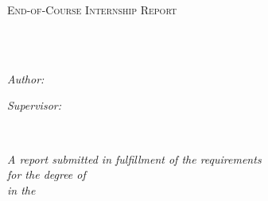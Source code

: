 \documentclass[
11pt, %
oneside, %
english, %
singlespacing, %
headsepline, %
]{MastersDoctoralThesis} %
\author{Simon \textsc{Bataille}} %
\begin{document}
\frontmatter %

\pagestyle{plain} %


\begin{titlepage}
\begin{center}

\vspace*{.06\textheight}
{\scshape\LARGE \univname\par}\vspace{1.5cm} %
\textsc{\Large End-of-Course Internship Report}\\[0.5cm] %

\HRule \\[0.4cm] %
{\huge \bfseries \ttitle\par}\vspace{0.4cm} %
\HRule \\[1.5cm] %

\begin{minipage}[t]{0.4\textwidth}
\begin{flushleft} \large
\emph{Author:}\\
\href{}{\authorname} %
\end{flushleft}
\end{minipage}
\begin{minipage}[t]{0.4\textwidth}
\begin{flushright} \large
\emph{Supervisor:} \\
\href{}{\supname} %
\end{flushright}
\end{minipage}\\[2.5cm]

\vfill

\large \textit{A report submitted in fulfillment of the requirements\\ for the degree of \degreename}\\[0.3cm] %
\textit{in the}\\[0.4cm]
\groupname\\\deptname\\[2cm] %


\end{center}
\end{titlepage}
\end{document}
